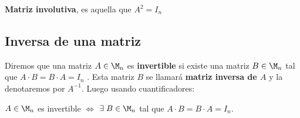 \begin{defin}
\textbf{Matriz involutiva}, es aquella que $A^2=I_n$
\end{defin}



\subsection{Inversa de una matriz}

\begin{defin}
Diremos que una matriz $A\in\M_n$ es \textbf{invertible} si existe una matriz
$B \in \M_n$ tal que $A\cdot B = B\cdot A = I_n$ . Esta matriz $B$ se llamará \textbf{matriz inversa de $A$} y la denotaremos por $A^{-1}$. Luego usando cuantificadores:  
\begin{center}
  $A\in \M_n$ es invertible $\Longleftrightarrow$ $\exists \;B \in\M_n$ tal que $A\cdot B = B\cdot A = I_n$.  
\end{center}

\end{defin}


